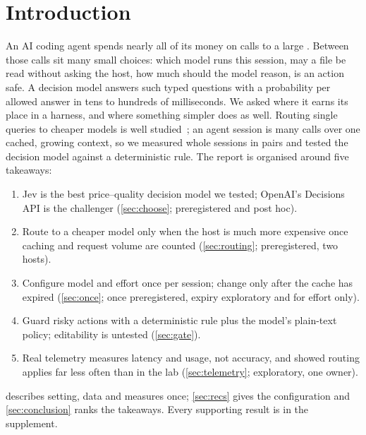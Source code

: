 \section{Introduction}\label{sec:intro}

An AI coding agent spends nearly all of its money on calls to a large . Between those calls sit many
small choices: which model runs this session, may a file be read without asking the host, how much should the model
reason, is an action safe. A decision model answers such typed questions with a probability per allowed answer in
tens to hundreds of milliseconds. We asked where it earns its place in a harness, and where something simpler does as
well. Routing single queries to cheaper models is well studied~\cite{routellm,frugalgpt}; an agent session is many
calls over one cached, growing context, so we measured whole sessions in pairs and tested the decision model against a
deterministic rule. The report is organised around five takeaways:
\begin{enumerate}[leftmargin=1.6em]
  \item Jev is the best price--quality decision model we tested; OpenAI's Decisions API is the challenger
    (\cref{sec:choose}; preregistered and post hoc).
  \item Route to a cheaper model only when the host is much more expensive once caching and request volume are counted
    (\cref{sec:routing}; preregistered, two hosts).
  \item Configure model and effort once per session; change only after the cache has expired (\cref{sec:once}; once
    preregistered, expiry exploratory and for effort only).
  \item Guard risky actions with a deterministic rule plus the model's plain-text policy; editability is untested
    (\cref{sec:gate}).
  \item Real telemetry measures latency and usage, not accuracy, and showed routing applies far less often than in the
    lab (\cref{sec:telemetry}; exploratory, one owner).
\end{enumerate}
 describes setting, data and measures once; \cref{sec:recs} gives the configuration and
\cref{sec:conclusion} ranks the takeaways. Every supporting result is in the supplement.
